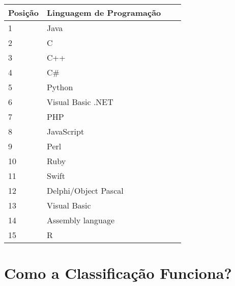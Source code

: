 \documentclass[
    12pt,               %
    openany,            %
    twoside,            %
    a4paper,            %
    brazil              %
    ]{abntex2}
\begin{document}
\begin{center}
\begin{tabular}{ | l | l | l | p{5cm} |}
\hline
Posição & Linguagem de Programação \\ \hline
1 & Java \\ \hline
2 & C \\ \hline
3 & C++ \\ \hline
4 & C\# \\ \hline
5 & Python \\ \hline
6 & Visual Basic .NET \\ \hline
7 & PHP \\ \hline
8 & JavaScript \\ \hline
9 & Perl \\ \hline
10 & Ruby \\ \hline
11 & Swift \\ \hline
12 & Delphi/Object Pascal \\ \hline
13 & Visual Basic \\ \hline
14 & Assembly language \\ \hline
15 & R \\ \hline
\end{tabular}
\end{center}

\section{Como a Classificação Funciona?}


\end{document}
